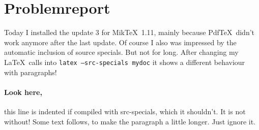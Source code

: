 \documentclass[11pt]{article}
\begin{document}
\section{Problemreport}
Today I installed the update 3 for Mik\TeX\ 1.11, mainly 
because Pdf\TeX\ didn't work anymore after the last update. 
Of course I also was impressed by the automatic inclusion
of source specials. But not for long. After changing my 
\LaTeX\ calls into \mbox{\texttt{latex --src-specials 
mydoc}} it shows a different behaviour with
paragraphs!

\paragraph{Look here,} this line is indented if compiled 
with src-specials, which it shouldn't. It is not without! 
Some text follows, to make the paragraph a little longer.
Just ignore it.

\enddocument
\end{document}
